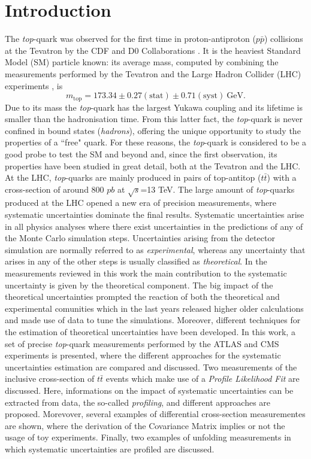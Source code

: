 \documentclass[12pt]{article}
\begin{document}
\section{Introduction}
The \emph{top}-quark was observed for the first time in proton-antiproton ($p\bar{p}$) collisions at the Tevatron by the CDF and D0 Collaborations 
\cite{Abe_1995,Abachi_1995}. It is the heaviest Standard Model (SM) particle known: its average mass, computed by combining the measurements performed by the Tevatron and the Large Hadron Collider (LHC) experiments \cite{atlas2014combination}, is 
\begin{equation}
m_{\mathrm{top}} = 173.34 \pm 0.27(\mathrm{stat}) \pm 0.71(\mathrm{syst})~\mathrm{GeV}.
\end{equation}
Due to its mass the \emph{top}-quark has the largest Yukawa coupling and its lifetime is smaller than the hadronisation time. From this latter fact, the \emph{top}-quark is never confined in bound states (\emph{hadrons}), offering the unique opportunity to study the properties of a ``free" quark.
For these reasons, the \emph{top}-quark is considered to be a good probe to test the SM and beyond and, since the first observation, its properties have been studied in great detail, both at the Tevatron and the LHC.  
At the LHC, \emph{top}-quarks are mainly produced in pairs of top-antitop ($t\bar{t}$) with a cross-section of around 800 $pb$ at $\sqrt{s}$=13 TeV.
The large amount of \emph{top}-quarks produced at the LHC opened a new era of precision measurements, where systematic uncertainties dominate the final results. Systematic uncertainties arise in all physics analyses where there exist uncertainties in the predictions of any of the Monte Carlo simulation steps. Uncertainties arising from the detector simulation are normally referred to as \emph{experimental}, whereas any uncertainty that arises in any of the other steps is usually classified as \emph{theoretical}. In the measurements reviewed in this work the main contribution to the systematic uncertainty is given by the theoretical component.
The big impact of the theoretical uncertainties prompted the reaction of both the theoretical and experimental comunities which in the last years released higher older calculations and made use of data to tune the simulations.
Moreover, different techniques for the estimation of theoretical uncertainties have been developed. In this work, a set of precise \emph{top}-quark measurements performed by the ATLAS and CMS experiments is presented, where the different approaches for the systematic uncertainties estimation are compared and discussed.
Two measurements of the inclusive cross-section of $t\bar{t}$ events which make use of a \emph{Profile Likelihood Fit} are discussed. Here, informations on the impact of systematic uncertainties can be extracted from data, the so-called \emph{profiling}, and different approaches are proposed. Morevover, several examples of differential cross-section measurementes are shown, where the derivation of the Covariance Matrix implies or not the usage of toy experiments. Finally, two examples of unfolding measurements in which systematic uncertainties are profiled are discussed. 
\end{document}
